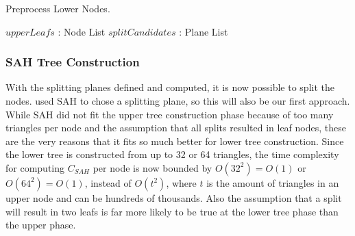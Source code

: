 \begin{algorithm}
  \caption{Preprocess Lower Nodes.}
  \label{alg:calcSplittingPlanes}
  \begin{algorithmic}
              {$upperLeafs$ : Node List}
              {$splitCandidates$ : Plane List}{
                    \ENDFOR
                  \ENDFOR
                \ENDFOR
              }
  \end{algorithmic}
\end{algorithm}



\subsubsection{SAH Tree Construction}


With the splitting planes defined and computed, it is now possible to split the
nodes. \zhou{} used SAH to chose a splitting plane, so this will also be our
first approach. While SAH did not fit the upper tree construction phase because
of too many triangles per node and the assumption that all splits resulted in
leaf nodes, these are the very reasons that it fits so much better for lower
tree construction. Since the lower tree is constructed from up to 32 or 64
triangles, the time complexity for computing $C_{SAH}$ per node is now bounded
by $O(32^2) = O(1)$ or $O(64^2) = O(1)$, instead of $O(t^2)$, where $t$ is the
amount of triangles in an upper node and can be hundreds of thousands. Also the
assumption that a split will result in two leafs is far more likely to be true
at the lower tree phase than the upper phase.

